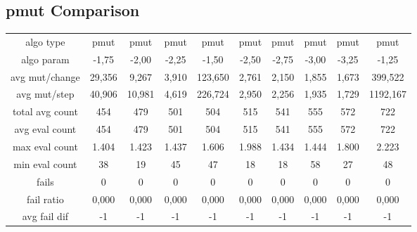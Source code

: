 \subsection{pmut Comparison}

\begin{tabular}[h]{cccccccccc}
algo type&             pmut&      pmut&      pmut&      pmut&      pmut&      pmut&      pmut&      pmut&      pmut\\
algo param&           -1,75&     -2,00&     -2,25&     -1,50&     -2,50&     -2,75&     -3,00&     -3,25&     -1,25\\
avg mut/change&      29,356&     9,267&     3,910&   123,650&     2,761&     2,150&     1,855&     1,673&   399,522\\
avg mut/step&        40,906&    10,981&     4,619&   226,724&     2,950&     2,256&     1,935&     1,729&  1192,167\\
\hline
total avg count&        454&       479&       501&       504&       515&       541&       555&       572&       722\\
avg eval count&         454&       479&       501&       504&       515&       541&       555&       572&       722\\
max eval count&       1.404&     1.423&     1.437&     1.606&     1.988&     1.434&     1.444&     1.800&     2.223\\
min eval count&          38&        19&        45&        47&        18&        18&        58&        27&        48\\
\hline
fails&                    0&         0&         0&         0&         0&         0&         0&         0&         0\\
fail ratio&           0,000&     0,000&     0,000&     0,000&     0,000&     0,000&     0,000&     0,000&     0,000\\
avg fail dif&            -1&        -1&        -1&        -1&        -1&        -1&        -1&        -1&        -1\\
\end{tabular}

